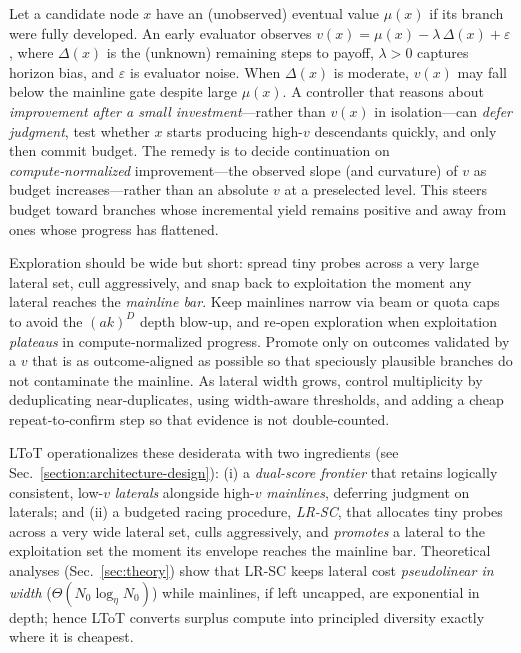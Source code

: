 \documentclass{article}
\begin{document}
Let a candidate node $x$ have an (unobserved) eventual value $\mu(x)$ if its branch were fully developed.
An early evaluator observes $v(x) = \mu(x) - \lambda \,\Delta(x) + \varepsilon$, where $\Delta(x)$ is the (unknown) remaining steps to payoff, $\lambda>0$ captures horizon bias, and $\varepsilon$ is evaluator noise.
When $\Delta(x)$ is moderate, $v(x)$ may fall below the mainline gate despite large $\mu(x)$.
A controller that reasons about \emph{improvement after a small investment}—rather than $v(x)$ in isolation—can \emph{defer judgment}, test whether $x$ starts producing high-$v$ descendants quickly, and only then commit budget.
\noindent The remedy is to decide continuation on \emph{compute‑normalized} improvement—the observed slope (and curvature) of $v$ as budget increases—rather than an absolute $v$ at a preselected level. This steers budget toward branches whose incremental yield remains positive and away from ones whose progress has flattened.

\noindent Exploration should be wide but short: spread tiny probes across a very large lateral set, cull aggressively, and snap back to exploitation the moment any lateral reaches the \emph{mainline bar}. Keep mainlines narrow via beam or quota caps to avoid the $(ak)^D$ depth blow‑up, and re‑open exploration when exploitation \emph{plateaus} in compute‑normalized progress. Promote only on outcomes validated by a $v$ that is as outcome‑aligned as possible so that speciously plausible branches do not contaminate the mainline. As lateral width grows, control multiplicity by deduplicating near‑duplicates, using width‑aware thresholds, and adding a cheap repeat‑to‑confirm step so that evidence is not double‑counted.


LToT operationalizes these desiderata with two ingredients (see Sec.~\ref{section:architecture-design}):
(i) a \emph{dual-score frontier} that retains logically consistent, low-$v$ \emph{laterals} alongside high-$v$ \emph{mainlines}, deferring judgment on laterals; and
(ii) a budgeted racing procedure, \emph{LR-SC}, that allocates tiny probes across a very wide lateral set, culls aggressively, and \emph{promotes} a lateral to the exploitation set the moment its envelope reaches the mainline bar.
Theoretical analyses (Sec.~\ref{sec:theory}) show that LR-SC keeps lateral cost \emph{pseudolinear in width} ($\Theta(N_0\log_{\eta} N_0)$) while mainlines, if left uncapped, are exponential in depth; hence LToT converts surplus compute into principled diversity exactly where it is cheapest.
\end{document}
